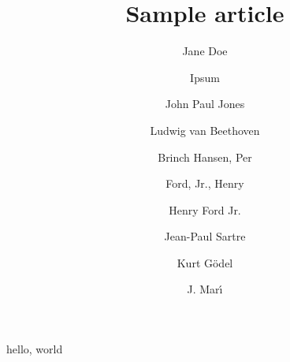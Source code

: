 \documentclass{amsart}
\title{Sample article}
\author{Jane Doe}
\author{Ipsum}
\author{John Paul Jones}
\author{Ludwig van Beethoven}
\author{Brinch Hansen, Per}
\author{Ford, Jr., Henry}
\author{Henry {Ford Jr.}}
\author{Jean-Paul Sartre}
\author{Kurt G\"odel}
\author{J. Mar\'\i}
\begin{document}
\maketitle

hello, world
\end{document}
